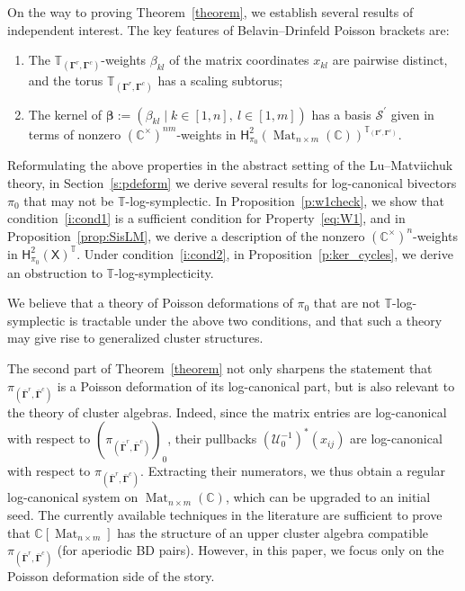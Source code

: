 \documentclass[11pt]{article}
\newcommand{\bbeta}{\boldsymbol{\beta}}
\newcommand{\bbg}{\bar{\mathbf{\Gamma}}}
\newcommand{\bg}{\mathbf{\Gamma}}
\DeclareMathOperator{\Mat}{Mat}
\theoremstyle{definition}\newtheorem{definition}[theorem]{Definition}
\theoremstyle{definition}\newtheorem{remark}[theorem]{Remark}
\theoremstyle{remark}
\numberwithin{equation}{section}
\begin{document}
On the way to proving Theorem~\ref{theorem}, we establish several results of independent interest. The key features of Belavin--Drinfeld Poisson brackets are:
\begin{enumerate}[1)]
    \item The $\mathbb{T}_{(\bg^r,\bg^c)}$-weights $\beta_{kl}$ of the matrix coordinates $x_{kl}$ are pairwise distinct, and the torus $\mathbb{T}_{(\bg^r,\bg^c)}$ has a scaling subtorus;\label{i:cond1}
    \item The kernel of $\bbeta:=(\beta_{kl} \mid k \in [1,n], \ l \in [1,m])$ has a basis $\mathcal{S}^\prime$ given in terms of nonzero $(\mathbb{C}^\times)^{nm}$-weights in $\mathsf{H}_{\pi_0}^2(\Mat_{n \times m}(\mathbb{C}))^{\mathbb{T}_{(\bg^r,\bg^c)}}$.\label{i:cond2}
\end{enumerate}
Reformulating the above properties in the abstract setting of the Lu--Matviichuk theory, in Section~\ref{s:pdeform} we derive several results for log-canonical bivectors $\pi_0$ that may not be $\mathbb{T}$-log-symplectic. In Proposition~\ref{p:w1check}, we show that condition~\ref{i:cond1} is a sufficient condition for Property~\eqref{eq:W1}, and in Proposition~\ref{prop:SisLM}, we derive a description of the nonzero $(\mathbb{C}^{\times})^{n}$-weights in $\mathsf{H}_{\pi_0}^2(\mathsf{X})^{\mathbb{T}}$. Under condition~\ref{i:cond2}, in Proposition~\ref{p:ker_cycles}, we derive an obstruction to $\mathbb{T}$-log-symplecticity. 

We believe that a theory of Poisson deformations of $\pi_0$ that are not $\mathbb{T}$-log-symplectic is tractable under the above two conditions, and that such a theory may give rise to generalized cluster structures.

The second part of Theorem~\ref{theorem} not only sharpens the statement that $\pi_{(\bbg^r,\bbg^c)}$ is a Poisson deformation of its log-canonical part, but is also relevant to the theory of cluster algebras. Indeed, since the matrix entries are log-canonical with respect to $(\pi_{(\bbg^r,\bbg^c)})_0$, their pullbacks $(\mathcal{U}_0^{-1})^*(x_{ij})$ are log-canonical with respect to $\pi_{(\bbg^r,\bbg^c)}$. Extracting their numerators, we thus obtain a regular log-canonical system on $\Mat_{n\times m}(\mathbb{C})$, which can be upgraded to an initial seed. The currently available techniques in the literature are sufficient to prove that $\mathbb{C}[\Mat_{n\times m}]$ has the structure of an upper cluster algebra compatible $\pi_{(\bbg^r,\bbg^c)}$ (for aperiodic BD pairs). However, in this paper, we focus only on the Poisson deformation side of the story.
\end{document}
